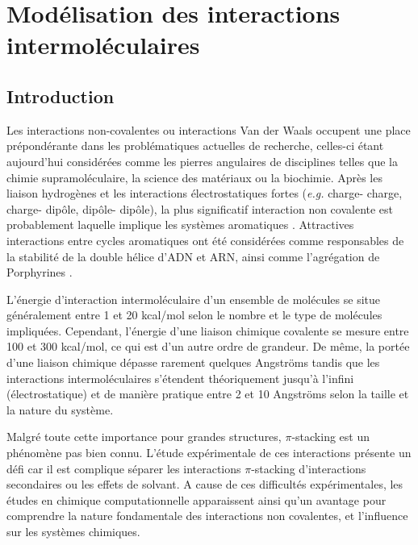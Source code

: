 \chapter[Modélisation des interactions intermoléculaires]{Modélisation des interactions intermoléculaires}
\minitoc
\restoregeometry

\newpage

\section*{Introduction}

Les interactions non-covalentes ou interactions Van der Waals occupent une place prépondérante dans les problématiques actuelles de recherche, celles-ci étant aujourd'hui considérées comme les pierres angulaires de disciplines telles que la chimie supramoléculaire, la science des matériaux ou la biochimie.  Après les liaison hydrogènes et les interactions électrostatiques fortes (\textit{e.g.} charge- charge, charge- dipôle, dipôle- dipôle), la plus significatif interaction non covalente est probablement laquelle implique les systèmes aromatiques \cite{grimme2008special}. Attractives interactions entre cycles aromatiques ont été considérées comme  responsables de la stabilité de la double hélice d'ADN et ARN, ainsi comme l'agrégation de Porphyrines \cite{mcgaughey1998pi}.

\bigskip

L'énergie d'interaction intermoléculaire d'un ensemble de molécules se situe généralement entre 1 et 20 kcal/mol selon le nombre et le type de molécules impliquées. Cependant, l'énergie d'une liaison chimique covalente se mesure entre 100 et 300 kcal/mol, ce qui est d’un autre ordre de grandeur. De même, la portée d’une liaison chimique dépasse rarement quelques Angströms tandis que les interactions intermoléculaires s'étendent théoriquement jusqu'à l'infini (électrostatique) et de manière pratique entre 2 et 10 Angströms selon la taille et la nature du système.
\bigskip

Malgré toute cette importance pour grandes structures, $\pi$-stacking est un phénomène pas bien connu. L’étude expérimentale de ces interactions présente un défi car il est complique séparer les interactions $\pi$-stacking d’interactions secondaires ou les effets de solvant. A cause de ces difficultés expérimentales, les études en chimique computationnelle apparaissent ainsi qu’un avantage pour comprendre la nature fondamentale des interactions non covalentes, et l’influence sur les systèmes chimiques. 

